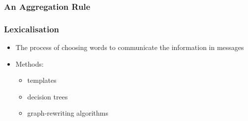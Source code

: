 \documentclass[compress,color=usenames]{beamer}
\begin{document}
\begin{frame}
\frametitle{An Aggregation Rule}

\label{f216}
 
\end{frame}

\begin{frame}
\frametitle{Lexicalisation}

\label{f218}
\begin{itemize}
\item { {The process of choosing words to communicate the information in messages}}
\item { {Methods:}}
\begin{itemize}
\item templates
\item decision trees
\item graph-rewriting algorithms
\end{itemize}
\end{itemize}
\end{frame}
\end{document}
